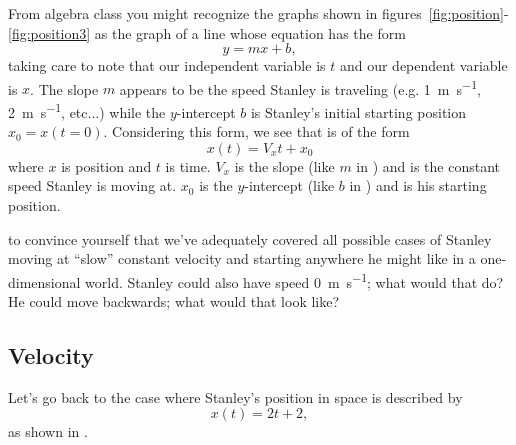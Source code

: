 \documentclass{tufte-handout}
\begin{document}
From algebra class you might recognize the graphs shown in figures~\ref{fig:position}-\ref{fig:position3} as the graph of a line whose equation has the form
\begin{equation}
y = mx + b,
\label{eq:algebraline}
\end{equation}
taking care to note that our independent variable is $t$ and our dependent variable is $x$. The slope $m$ appears to be the speed Stanley is traveling (e.g. \SI{1}{\meter\per\second}, \SI{2}{\meter\per\second}, etc...) while the $y$-intercept $b$ is Stanley's initial starting position $x_0 = x(t=0)$. Considering this form, we see that  is of the form
\begin{equation}
x(t) = V_x t + x_0 
\end{equation}
where $x$ is position and $t$ is time. $V_x$ is the slope (like $m$ in ) and is the constant speed Stanley is moving at. $x_0$ is the $y$-intercept (like $b$ in ) and is his starting position. 

 to convince yourself that we've adequately covered all possible cases of Stanley moving at ``slow'' constant velocity and starting anywhere he might like in a one-dimensional world. Stanley could also have speed \SI{0}{\meter\per\second}; what would that do? He could move backwards; what would that look like? 

\subsection{Velocity}
Let's go back to the case where Stanley's position in space is described by 
\begin{equation}
x(t) = 2 t + 2,
\end{equation}
as shown in .
\begin{marginfigure}
\caption{Stanley's position and velocity}
\label{fig:velocity1}
\end{marginfigure}
\end{document}
